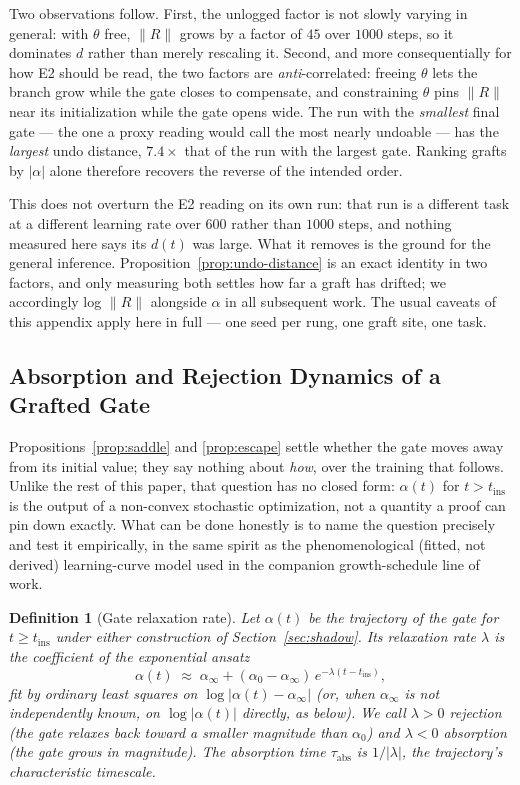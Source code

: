 \documentclass[11pt,a4paper]{article}
\newtheorem{definition}{Definition}
\begin{document}
Two observations follow. First, the unlogged factor is not slowly varying in general: with $\theta$
free, $\|R\|$ grows by a factor of $45$ over $1000$ steps, so it dominates $d$ rather than merely
rescaling it. Second, and more consequentially for how E2 should be read, the two factors are
\emph{anti}-correlated: freeing $\theta$ lets the branch grow while the gate closes to compensate,
and constraining $\theta$ pins $\|R\|$ near its initialization while the gate opens wide. The run
with the \emph{smallest} final gate --- the one a proxy reading would call the most nearly
undoable --- has the \emph{largest} undo distance, $7.4\times$ that of the run with the largest
gate. Ranking grafts by $|\alpha|$ alone therefore recovers the reverse of the intended order.

This does not overturn the E2 reading on its own run: that run is a different task at a different
learning rate over $600$ rather than $1000$ steps, and nothing measured here says its $d(t)$ was
large. What it removes is the ground for the general inference. Proposition~\ref{prop:undo-distance}
is an exact identity in two factors, and only measuring both settles how far a graft has drifted;
we accordingly log $\|R\|$ alongside $\alpha$ in all subsequent work. The usual caveats of this
appendix apply here in full --- one seed per rung, one graft site, one task.

\subsection{Absorption and Rejection Dynamics of a Grafted Gate}
\label{sec:absorption}

Propositions~\ref{prop:saddle} and \ref{prop:escape} settle whether the gate moves away from its
initial value; they say nothing about \emph{how}, over the training that follows. Unlike the rest
of this paper, that question has no closed form: $\alpha(t)$ for $t > t_{\mathrm{ins}}$ is the
output of a non-convex stochastic optimization, not a quantity a proof can pin down exactly.
What can be done honestly is to name the question precisely and test it empirically, in the same
spirit as the phenomenological (fitted, not derived) learning-curve model used in the companion
growth-schedule line of work.

\begin{definition}[Gate relaxation rate]
\label{def:relaxation}
Let $\alpha(t)$ be the trajectory of the gate for $t \geq t_{\mathrm{ins}}$ under either construction
of Section~\ref{sec:shadow}. Its \emph{relaxation rate} $\lambda$ is the coefficient of the
exponential ansatz
\[
\alpha(t) \;\approx\; \alpha_\infty + (\alpha_0 - \alpha_\infty)\, e^{-\lambda (t - t_{\mathrm{ins}})},
\]
fit by ordinary least squares on $\log|\alpha(t) - \alpha_\infty|$ (or, when $\alpha_\infty$ is not
independently known, on $\log|\alpha(t)|$ directly, as below). We call $\lambda > 0$
\emph{rejection} (the gate relaxes back toward a smaller magnitude than $\alpha_0$) and
$\lambda < 0$ \emph{absorption} (the gate grows in magnitude). The \emph{absorption time}
$\tau_{\mathrm{abs}}$ is $1/|\lambda|$, the trajectory's characteristic timescale.
\end{definition}
\end{document}
